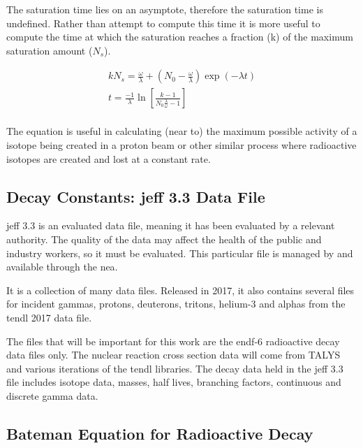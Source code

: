 The saturation time lies on an asymptote, therefore the saturation time is undefined.  Rather than attempt to compute this time it is more useful to compute the time at which the saturation reaches a fraction (k) of the maximum saturation amount ($N_{s}$).

\begin{equation}
\begin{split}
k N_{s} = \frac{\omega}{\lambda} + \left(N_{0} - \frac{\omega}{\lambda} \right) \exp(-\lambda t) \\
t = \frac{-1}{\lambda} \ln \left[ \frac{k-1}{N_0 \frac{\lambda}{\omega} - 1} \right] \\
\end{split}
\label{eq:saturationactivity}
\end{equation}

The equation is useful in calculating (near to) the maximum possible activity of a isotope being created in a proton beam or other similar process where radioactive isotopes are created and lost at a constant rate.


\subsection{Decay Constants: \acrfull{jeff} 3.3 Data File}

\acrshort{jeff} 3.3 is an evaluated data file\cite{jeff311}, meaning it has been evaluated by a relevant authority.  The quality of the data may affect the health of the public and industry workers, so it must be evaluated.  This particular file is managed by and available through the \acrfull{nea}.

It is a collection of many data files.  Released in 2017, it also contains several files for incident gammas, protons, deuterons, tritons, helium-3 and alphas from the \acrshort{tendl} 2017 data file.

The files that will be important for this work are the \acrshort{endf}-6 radioactive decay data files only.  The nuclear reaction cross section data will come from TALYS and various iterations of the \acrshort{tendl} libraries.  The decay data held in the \acrshort{jeff} 3.3 file includes isotope data, masses, half lives, branching factors, continuous and discrete gamma data.


\subsection{Bateman Equation for Radioactive Decay}

